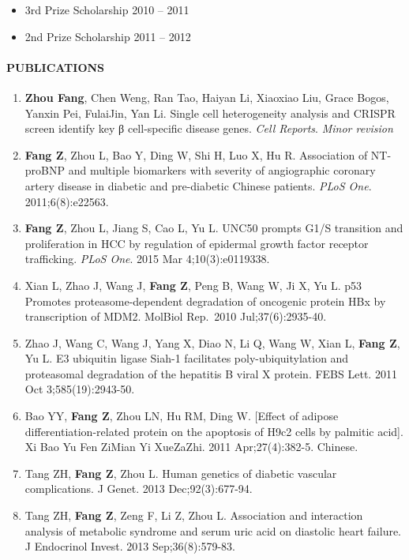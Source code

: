 \documentclass[]{article}
\let\oldparagraph\paragraph
\renewcommand{\paragraph}[1]{\oldparagraph{#1}\mbox{}}
\begin{document}
\begin{itemize}
\item
  3rd Prize Scholarship { 2010 -- 2011 }
\item
  2nd Prize Scholarship { 2011 -- 2012 }
\end{itemize}

\hypertarget{publications}{%
\paragraph{PUBLICATIONS}\label{publications}}

\begin{enumerate}
\def\labelenumi{\arabic{enumi}.}
\item
  \textbf{Zhou Fang}, Chen Weng, Ran Tao, Haiyan Li, Xiaoxiao Liu, Grace
  Bogos, Yanxin Pei, FulaiJin, Yan Li. Single cell heterogeneity
  analysis and CRISPR screen identify key β cell-specific disease genes.
  \emph{Cell Reports}. \emph{Minor revision}
\item
  \textbf{Fang Z}, Zhou L, Bao Y, Ding W, Shi H, Luo X, Hu R.
  Association of NT-proBNP and multiple biomarkers with severity of
  angiographic coronary artery disease in diabetic and pre-diabetic
  Chinese patients. \emph{PLoS One}. 2011;6(8):e22563.
\item
  \textbf{Fang Z}, Zhou L, Jiang S, Cao L, Yu L. UNC50 prompts G1/S
  transition and proliferation in HCC by regulation of epidermal growth
  factor receptor trafficking. \emph{PLoS One}. 2015 Mar
  4;10(3):e0119338.
\item
  Xian L, Zhao J, Wang J, \textbf{Fang Z}, Peng B, Wang W, Ji X, Yu L.
  p53 Promotes proteasome-dependent degradation of oncogenic protein HBx
  by transcription of MDM2. MolBiol Rep.~2010 Jul;37(6):2935-40.
\item
  Zhao J, Wang C, Wang J, Yang X, Diao N, Li Q, Wang W, Xian L,
  \textbf{Fang Z}, Yu L. E3 ubiquitin ligase Siah-1 facilitates
  poly-ubiquitylation and proteasomal degradation of the hepatitis B
  viral X protein. FEBS Lett. 2011 Oct 3;585(19):2943-50.
\item
  Bao YY, \textbf{Fang Z}, Zhou LN, Hu RM, Ding W. {[}Effect of adipose
  differentiation-related protein on the apoptosis of H9c2 cells by
  palmitic acid{]}. Xi Bao Yu Fen ZiMian Yi XueZaZhi. 2011
  Apr;27(4):382-5. Chinese.
\item
  Tang ZH, \textbf{Fang Z}, Zhou L. Human genetics of diabetic vascular
  complications. J Genet. 2013 Dec;92(3):677-94.
\item
  Tang ZH, \textbf{Fang Z}, Zeng F, Li Z, Zhou L. Association and
  interaction analysis of metabolic syndrome and serum uric acid on
  diastolic heart failure. J Endocrinol Invest. 2013 Sep;36(8):579-83.
\end{enumerate}
\end{document}

